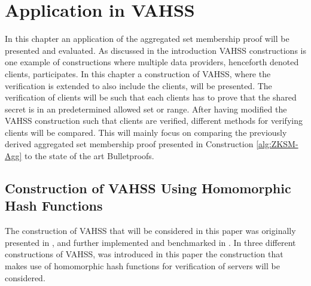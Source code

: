 \chapter{Application in VAHSS}
\label{ch:VAHSS}
In this chapter an application of the aggregated set membership proof will be presented and evaluated. As discussed in the introduction VAHSS constructions is one example of constructions where multiple data providers, henceforth denoted clients, participates. In this chapter a construction of VAHSS, where the verification is extended to also include the clients, will be presented. The verification of clients will be such that each clients has to prove that the shared secret is in an predetermined allowed set or range.
After having modified the VAHSS construction such that clients are verified, different methods for verifying clients will be compared. This will mainly focus on comparing the previously derived aggregated set membership proof presented in Construction \ref{alg:ZKSM-Agg} to the state of the art Bulletproofs. 



\section{Construction of VAHSS Using Homomorphic Hash Functions}
\label{sec:VAHSS-HSS}
The construction of VAHSS that will be considered in this paper was originally presented in \cite{SumItUp}, and further implemented and benchmarked in \cite{VAHSS}. In \cite{SumItUp} three different constructions of VAHSS, was  introduced in this paper the construction that makes use of homomorphic hash functions for verification of servers will be considered.  



